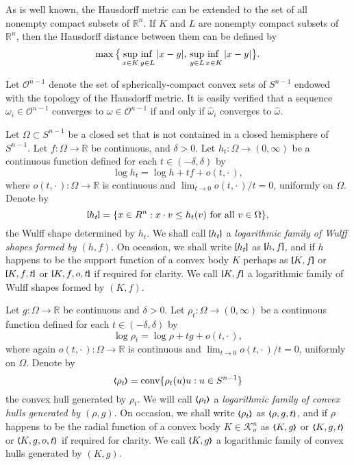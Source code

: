 \documentclass{cpamart1}     %
\theoremstyle{definition}
\theoremstyle{remark}
\newcommand{\ro}{\mathbb R}
\newcommand{\rn}{\mathbb R^n}
\newcommand{\sn}{S^{n-1}}
\newcommand{\kno}{\mathcal K^n_o}
\newcommand{\sco}{\mathcal O^{n-1}}
\newcommand{\conv}{\operatorname{conv}}
\newcommand{\blb}{\raise.3ex\hbox{$\scriptstyle \pmb \lbrack$}}
\newcommand{\brb}{\raise.3ex\hbox{$\scriptstyle \pmb \rbrack$}}
\newcommand{\bla}{\raise.2ex\hbox{$\scriptstyle\pmb \langle$}}
\newcommand{\bra}{\raise.2ex\hbox{$\scriptstyle\pmb \rangle$}}
\begin{document}
As is well known, the Hausdorff metric can be extended to the set of all nonempty compact subsets of $\rn$. If $K$ and $L$ are nonempty compact subsets of $\rn$, then the Hausdorff distance between them can be defined by 
\[
\max\big\{\adjustlimits\sup_{x\in K}\inf_{y\in L}|x-y|, \, \adjustlimits\sup_{y\in L} \inf_{x\in K} |x-y|\big\}.
\]

Let $\sco$ denote the set of spherically-compact convex sets of $\sn$ endowed with the topology of the Hausdorff metric. It is easily verified  that a sequence $\omega_i\in \sco $ converges to $\omega \in \sco$ if and only if $\hat \omega_i$ converges to $\hat \omega$. 




\medskip


Let $\Omega \subset \sn$
be a closed set that is not contained in a closed hemisphere of $\sn$.
Let $f: \Omega \to \ro$ be continuous, and $\delta>0$.
Let $h_t : \Omega \to (0, \infty)$ be a continuous function defined
for each $t\in(-\delta,\delta)$ by
\begin{equation*}
\log h_t= \log h + t f + o(t,\cdot\,),
\end{equation*}
where $o(t,\cdot\,): \Omega \to \ro$ is continuous and $\lim_{t\to 0} o(t,\cdot\,)/t = 0$,
uniformly on $\Omega$.
Denote by
\[
\blb h_t \brb = \{x\in\rn : \text{$x\cdot v \le h_t(v)$ for all $v\in \Omega$}\},
\]
the Wulff shape determined by $h_t$. We shall call $\blb h_t \brb$
a {\it logarithmic family of Wulff shapes formed by $(h,f)$}. On occasion,
we shall write $\blb h_t \brb$ as $\blb h,f\brb$, and if $h$ happens to
be the support function of a convex body $K$ perhaps as $\blb K,f \brb$  or $\blb K,f,t\brb$
or $\blb K,f,o,t\brb$ if required for clarity.
We call $\blb K,f\brb$ a logarithmic family of Wulff shapes formed by $(K,f)$.
\smallskip


Let $g: \Omega \to \ro$ be continuous and $\delta>0$.
Let $\rho_t : \Omega \to (0,\infty)$ be a continuous function defined
for each $t\in(-\delta,\delta)$ by
\begin{equation*}
\log \rho_t= \log \rho + t g + o(t,\cdot\,),
\end{equation*}
where again $o(t,\cdot\,): \Omega \to \ro$ is continuous and $\lim_{t\to 0} o(t,\cdot\,)/t = 0$,
uniformly on $\Omega$.
Denote by
\[
\bla \rho_{t} \bra = \conv \{\rho_{t}(u)u : u\in\sn \}
\]
the convex hull generated by $\rho_{t}$. We will call $\bla \rho_{t} \bra$
a {\it logarithmic family of convex hulls generated by $(\rho,g)$}.
On occasion, we shall write $\bla \rho_{t} \bra$ as $\bla \rho,g,t\bra$,
and if $\rho$ happens to be the radial function of a convex body $K\in\kno$
as $\bla K,g\bra$ or $\bla K,g,t\bra$ or $\bla K,g,o,t\bra$ if required for clarity.
We call $\bla K,g\bra$ a logarithmic family of convex hulls generated by $(K,g)$.
\end{document}

